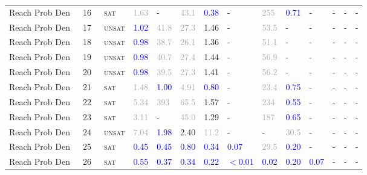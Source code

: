 \begin{center}
{\begin{longtable}{@{}llllllllllllll@{}}
Reach Prob Den~ & 16 & ~\textsc{sat} & \textcolor{darkgray}{1.63} & - & \textcolor{darkgray}{43.1} & \textcolor{blue}{0.38} & - & \textcolor{darkgray}{255} & \textcolor{blue}{0.71} & - & - & - & - \\
Reach Prob Den~ & 17 & ~\textsc{unsat} & \textcolor{blue}{1.02} & \textcolor{darkgray}{41.8} & \textcolor{darkgray}{27.3} & \textcolor{second}{1.46} & - & \textcolor{darkgray}{53.5} & - & - & - & - & - \\
Reach Prob Den~ & 18 & ~\textsc{unsat} & \textcolor{blue}{0.98} & \textcolor{darkgray}{38.7} & \textcolor{darkgray}{26.1} & \textcolor{second}{1.36} & - & \textcolor{darkgray}{51.1} & - & - & - & - & - \\
Reach Prob Den~ & 19 & ~\textsc{unsat} & \textcolor{blue}{0.98} & \textcolor{darkgray}{40.7} & \textcolor{darkgray}{27.4} & \textcolor{second}{1.44} & - & \textcolor{darkgray}{56.9} & - & - & - & - & - \\
Reach Prob Den~ & 20 & ~\textsc{unsat} & \textcolor{blue}{0.98} & \textcolor{darkgray}{39.5} & \textcolor{darkgray}{27.3} & \textcolor{second}{1.41} & - & \textcolor{darkgray}{56.2} & - & - & - & - & - \\
Reach Prob Den~ & 21 & ~\textsc{sat} & \textcolor{darkgray}{1.48} & \textcolor{blue}{1.00} & \textcolor{darkgray}{4.91} & \textcolor{blue}{0.80} & - & \textcolor{darkgray}{23.4} & \textcolor{blue}{0.75} & - & - & - & - \\
Reach Prob Den~ & 22 & ~\textsc{sat} & \textcolor{darkgray}{5.34} & \textcolor{darkgray}{393} & \textcolor{darkgray}{65.5} & \textcolor{second}{1.57} & - & \textcolor{darkgray}{234} & \textcolor{blue}{0.55} & - & - & - & - \\
Reach Prob Den~ & 23 & ~\textsc{sat} & \textcolor{darkgray}{3.11} & - & \textcolor{darkgray}{45.0} & \textcolor{second}{1.29} & - & \textcolor{darkgray}{187} & \textcolor{blue}{0.65} & - & - & - & - \\
Reach Prob Den~ & 24 & ~\textsc{unsat} & \textcolor{darkgray}{7.04} & \textcolor{blue}{1.98} & \textcolor{second}{2.40} & \textcolor{darkgray}{11.2} & - & - & \textcolor{darkgray}{30.5} & - & - & - & - \\
Reach Prob Den~ & 25 & ~\textsc{sat} & \textcolor{blue}{0.45} & \textcolor{blue}{0.45} & \textcolor{blue}{0.80} & \textcolor{blue}{0.34} & \textcolor{blue}{0.07} & \textcolor{darkgray}{29.5} & \textcolor{blue}{0.20} & - & - & - & - \\
Reach Prob Den~ & 26 & ~\textsc{sat} & \textcolor{blue}{0.55} & \textcolor{blue}{0.37} & \textcolor{blue}{0.34} & \textcolor{blue}{0.22} & \textcolor{blue}{$<$0.01} & \textcolor{blue}{0.02} & \textcolor{blue}{0.20} & \textcolor{blue}{0.07} & - & - & - \\

\end{longtable}}
\end{center}
